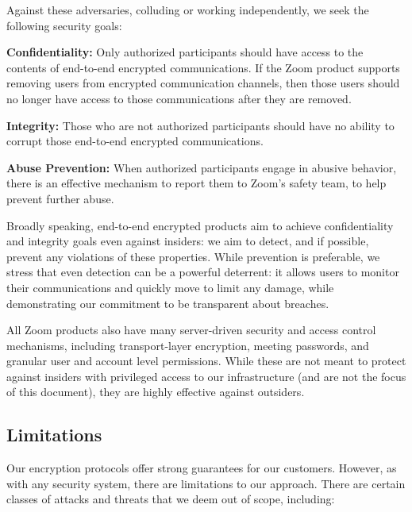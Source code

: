 Against these adversaries, colluding or working independently, we seek the following security goals:

\begin{description}
	\item {\bf Confidentiality:} Only authorized participants should have access to the contents of
	end-to-end encrypted communications. If the Zoom product supports removing users from encrypted
	communication channels, then those users should no longer have access to those communications
	after they are removed.
	\item {\bf Integrity:} Those who are not authorized participants should have no ability to
	corrupt those end-to-end encrypted communications.
	\item {\bf Abuse Prevention:} When authorized participants engage in abusive behavior, there is
	an effective mechanism to report them to Zoom's safety team, to help prevent further abuse.
\end{description}

Broadly speaking, end-to-end encrypted products aim to achieve confidentiality and integrity goals
even against insiders: we aim to detect, and if possible, prevent any violations of these
properties. While prevention is preferable, we stress that even detection can be a powerful
deterrent: it allows users to monitor their communications and quickly move to limit any damage,
while demonstrating our commitment to be transparent about breaches.

All Zoom products also have many server-driven security and access control mechanisms, including
transport-layer encryption, meeting passwords, and granular user and account level permissions.
While these are not meant to protect against insiders with privileged access to our infrastructure
(and are not the focus of this document), they are highly effective against outsiders.

\subsection{Limitations}
\label{subsec:overall-limit}

Our encryption protocols offer strong guarantees for our customers. However, as with any security
system, there are limitations to our approach. There are certain classes of attacks and threats that
we deem out of scope, including:

